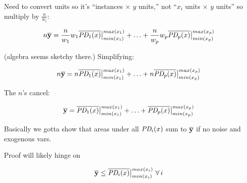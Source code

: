 \documentclass[12pt]{article}
\begin{document}
Need to convert units so it's ``instances $\times$ $y$ units,'' not ``$x_i$ units $\times$ $y$ units'' so multiply by $\frac{n}{w_i}$:

\[
n \overline {\bf y} = \frac{n}{w_1} w_1\overline{\text{\it PD}_1(x)}\big |_{min(x_1)}^{max(x_1)} + \ldots + \frac{n}{w_p} w_p\overline{\text{\it PD}_p(x)}\big |_{min(x_p)}^{max(x_p)}
\]

(algebra seems sketchy there.) Simplifying:

\[
n \overline {\bf y} = n\overline{\text{\it PD}_1(x)}\big |_{min(x_1)}^{max(x_1)} + \ldots + n \overline{\text{\it PD}_p(x)}\big |_{min(x_p)}^{max(x_p)}
\]

The $n$'s cancel:

\[
\overline {\bf y} = \overline{\text{\it PD}_1(x)}\big |_{min(x_1)}^{max(x_1)} + \ldots + \overline{\text{\it PD}_p(x)}\big |_{min(x_p)}^{max(x_p)}
\]

Basically we gotta show that areas under all $\text{\it PD}_i(x)$ sum to $\overline{\bf y}$ if no noise and exogenous vars.

Proof will likely hinge on

\[
\overline {\bf y} \le \overline{\text{\it PD}_i(x)}\big |_{min(x_i)}^{max(x_i)} ~\forall\, i
\]





\end{document}

